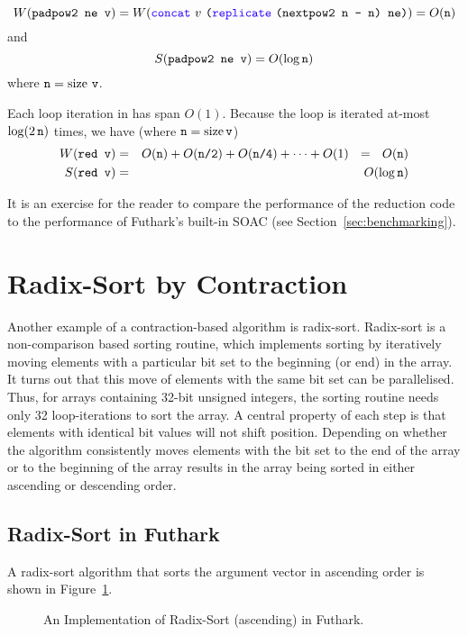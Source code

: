 \documentclass[oneside,11pt]{book}
\newcommand{\size}{\ensuremath{\mathrm{size}}}
\renewcommand{\log}{\ensuremath{\mathrm{log}}}
\newenvironment{wrap}{\vspace{\topskip}\par\noindent\begin{minipage}{\linewidth}}{\end{minipage}\par}
\begin{document}
$$W(\kw{padpow2 ne v}) = W(\fop{concat}~v~\kw{(}\fop{replicate}~\kw{(nextpow2 n - n) ne)}) = O(\kw{n})$$
and
$$S(\kw{padpow2 ne v}) = O(\log\,\kw{n})$$
where $\kw{n} = \size~\kw{v}$.

Each loop iteration in  has span $O(1)$. Because the loop is
iterated at-most $\log(2\,\kw{n})$ times, we have (where $\kw{n} =
\size\,\kw{v}$)
\begin{eqnarray*}
  W(\kw{red v}) & = & O(\kw{n}) + O(\kw{n/2}) + O(\kw{n/4}) + \cdots + O(1) ~~=~~ O(\kw{n}) \\
  S(\kw{red v}) & = & O(\log\,\kw{n})
\end{eqnarray*}

It is an exercise for the reader to compare the performance of the
reduction code to the performance of Futhark's built-in 
SOAC (see Section~\ref{sec:benchmarking}).

\section{Radix-Sort by Contraction}

Another example of a contraction-based algorithm is
radix-sort. Radix-sort is a non-comparison based sorting routine,
which implements sorting by iteratively moving elements with a
particular bit set to the beginning (or end) in the array. It turns
out that this move of elements with the same bit set can be
parallelised. Thus, for arrays containing 32-bit unsigned integers,
the sorting routine needs only 32 loop-iterations to sort the array. A
central property of each step is that elements with identical bit
values will not shift position. Depending on whether the algorithm
consistently moves elements with the bit set to the end of the array
or to the beginning of the array results in the array being sorted in
either ascending or descending order.

\subsection{Radix-Sort in Futhark}
\label{sec:radixsort}

A radix-sort algorithm that sorts the argument vector in ascending
order is shown in Figure~\ref{fig:rsort}.

\begin{figure}
\begin{wrap}

\end{wrap}
\caption{An Implementation of Radix-Sort (ascending) in Futhark.}
\label{fig:rsort}
\end{figure}
\end{document}
